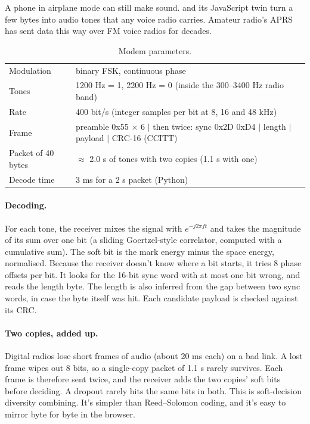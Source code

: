 A phone in airplane mode can still make sound.  and its JavaScript twin  turn a few bytes
into audio tones that any voice radio carries. Amateur radio's APRS has sent data this way over FM voice radios for decades.

\begin{table}[htbp]\centering\small
\caption{Modem parameters.}\label{tab:modem}
\begin{tabular}{ll}
\toprule
Modulation & binary FSK, continuous phase\\
Tones & 1200 Hz = 1, 2200 Hz = 0 (inside the 300--3400 Hz radio band)\\
Rate & 400 bit/s (integer samples per bit at 8, 16 and 48 kHz)\\
Frame & preamble 0x55 $\times$ 6 $|$ then twice: sync 0x2D 0xD4 $|$ length $|$ payload $|$ CRC-16 (CCITT)\\
Packet of 40 bytes & $\approx$ 2.0 s of tones with two copies (1.1 s with one)\\
Decode time & 3 ms for a 2 s packet (Python)\\
\bottomrule
\end{tabular}
\end{table}

\paragraph{Decoding.} For each tone, the receiver mixes the signal with $e^{-j2\pi f t}$ and takes the magnitude of its sum
over one bit (a sliding Goertzel-style correlator, computed with a cumulative sum). The soft bit is the mark energy minus the
space energy, normalised. Because the receiver doesn't know where a bit starts, it tries 8 phase offsets per bit. It looks
for the 16-bit sync word with at most one bit wrong, and reads the length byte. The length is also inferred from the gap
between two sync words, in case the byte itself was hit. Each candidate payload is checked against its CRC.

\paragraph{Two copies, added up.} Digital radios lose short frames of audio (about 20 ms each) on a bad link. A lost frame
wipes out 8 bits, so a single-copy packet of 1.1 s rarely survives. Each frame is therefore sent twice, and the receiver adds
the two copies' soft bits before deciding. A dropout rarely hits the same bits in both. This is soft-decision diversity
combining. It's simpler than Reed--Solomon coding, and it's easy to mirror byte for byte in the browser.

